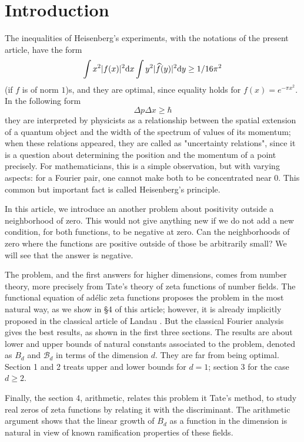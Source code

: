 \section*{Introduction}


The inequalities of Heisenberg's experiments, with the notations of the present article, have the form
\[
    \int x^2 |f(x)|^2 \mathrm{d} x \int y^2 |\widehat{f}(y)|^2 \mathrm{d} y \geq 1 / 16 \pi^2
\]
(if $f$ is of norm $1$)s, and they are optimal, since equality holds for $f(x) = e^{-\pi x^2}$.
In the following form
\[
    \Delta p \Delta x \geq \hbar
\]
they are interpreted by physicists as a relationship between the spatial extension of a quantum object and the width of the spectrum of values of its momentum; when these relations appeared, they are called as "uncertainty relations", since it is a question about determining the position and the momentum of a point precisely.
For mathematicians, this is a simple observation, but with varying aspects: for a Fourier pair, one cannot make both to be concentrated near $0$.
This common but important fact is called Heisenberg's principle.

In this article, we introduce an another problem about positivity outside a neighborhood of zero.
This would not give anything new if we do not add a new condition, for both functions, to be negative at zero.
Can the neighborhoods of zero where the functions are positive outside of those be arbitrarily small?
We will see that the answer is negative.

The problem, and the first answers for higher dimensions, comes from number theory, more precisely from Tate's theory of zeta functions of number fields.
The functional equation of ad\'elic zeta functions proposes the problem in the most natural way, as we show in \S 4 of this article; however, it is already implicitly proposed in the classical article of Landau \cite{landau1918uber}.
But the classical Fourier analysis gives the best results, as shown in the first three sections.
The results are about lower and upper bounds of natural constants associated to the problem, denoted as $B_d$ and $\mathcal{B}_d$ in terms of the dimension $d$.
They are far from being optimal.
Section 1 and 2 treats upper and lower bounds for $d = 1$; section 3 for the case $d \geq 2$.

Finally, the section 4, arithmetic, relates this problem it Tate's method, to study real zeros of zeta functions by relating it with the discriminant.
The arithmetic argument shows that the linear growth of $B_d$ as a function in the dimension is natural in view of known ramification properties of these fields.

